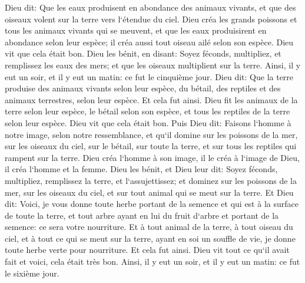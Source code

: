 \verse Dieu dit: Que les eaux produisent en abondance des animaux vivants, et que des oiseaux volent sur la terre vers l`étendue du ciel. 
\verse Dieu créa les grands poissons et tous les animaux vivants qui se meuvent, et que les eaux produisirent en abondance selon leur espèce; il créa aussi tout oiseau ailé selon son espèce. Dieu vit que cela était bon. 
\verse Dieu les bénit, en disant: Soyez féconds, multipliez, et remplissez les eaux des mers; et que les oiseaux multiplient sur la terre. 
\verse Ainsi, il y eut un soir, et il y eut un matin: ce fut le cinquième jour. 
\verse Dieu dit: Que la terre produise des animaux vivants selon leur espèce, du bétail, des reptiles et des animaux terrestres, selon leur espèce. Et cela fut ainsi. 
\verse Dieu fit les animaux de la terre selon leur espèce, le bétail selon son espèce, et tous les reptiles de la terre selon leur espèce. Dieu vit que cela était bon. 
\verse Puis Dieu dit: Faisons l`homme à notre image, selon notre ressemblance, et qu`il domine sur les poissons de la mer, sur les oiseaux du ciel, sur le bétail, sur toute la terre, et sur tous les reptiles qui rampent sur la terre. 
\verse Dieu créa l`homme à son image, il le créa à l`image de Dieu, il créa l`homme et la femme. 
\verse Dieu les bénit, et Dieu leur dit: Soyez féconds, multipliez, remplissez la terre, et l`assujettissez; et dominez sur les poissons de la mer, sur les oiseaux du ciel, et sur tout animal qui se meut sur la terre. 
\verse Et Dieu dit: Voici, je vous donne toute herbe portant de la semence et qui est à la surface de toute la terre, et tout arbre ayant en lui du fruit d`arbre et portant de la semence: ce sera votre nourriture. 
\verse Et à tout animal de la terre, à tout oiseau du ciel, et à tout ce qui se meut sur la terre, ayant en soi un souffle de vie, je donne toute herbe verte pour nourriture. Et cela fut ainsi. 
\verse Dieu vit tout ce qu`il avait fait et voici, cela était très bon. Ainsi, il y eut un soir, et il y eut un matin: ce fut le sixième jour. 

